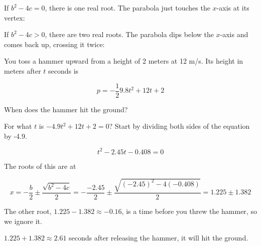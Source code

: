 If $b^2 - 4c = 0$, there is one real root. The parabola just touches the
$x$-axis at its vertex:
\begin{center}
  
\end{center}

If $b^2 - 4c > 0$, there are two real roots. The parabola dips below the
$x$-axis and comes back up, crossing it twice:
\begin{center}
  
  
\end{center}
\begin{Exercise}[title={Roots of a Quadratic}, label=solve_quadratic]

  You toss a hammer upward from a height of 2 meters at 12 m/s. Its height
  in meters after $t$ seconds is

  $$p = -\frac{1}{2}9.8 t^2 + 12t + 2$$

  When does the hammer hit the ground?

  
\end{Exercise}
\begin{Answer}[ref=solve_quadratic]

  For what $t$ is  $-4.9 t^2 + 12t + 2 = 0$?  Start by dividing both sides of the equation by -4.9.

  $$t^2 - 2.45 t - 0.408 = 0$$

  The roots of this are at

  $$x = -\frac{b}{2} \pm \frac{\sqrt{b^2 - 4c}}{2} = -\frac{-2.45}{2} \pm \frac{\sqrt{(-2.45)^2 - 4(-0.408)}}{2} = 1.225 \pm 1.382$$

  The other root, $1.225 - 1.382 \approx -0.16$, is a time before you threw
  the hammer, so we ignore it.

  $1.225 + 1.382 \approx 2.61$ seconds after releasing the hammer, it will hit the ground.

  
\end{Answer}


